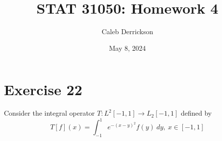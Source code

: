 

\title{STAT 31050: Homework 4}
\author{Caleb Derrickson}
\date{May 8, 2024}


\onehalfspacing
\maketitle
\allowdisplaybreaks

\tableofcontents

\newpage
\section{Exercise 22}
Consider the integral operator $T: L^2[-1, 1] \to L_2[-1, 1]$ defined by
\[T[f](x) = \int_{-1}^1 e^{-(x - y)^2} f(y) \ dy, \ x \in [-1, 1]\]

